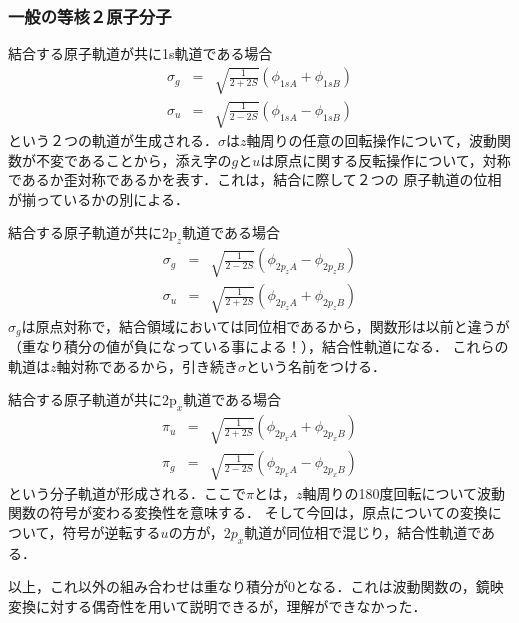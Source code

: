 \documentclass[uplatex, dvipdfmx]{jsreport}
\begin{document}
\subsubsection{一般の等核２原子分子}

\begin{example}
    結合する原子軌道が共に1s軌道である場合
    \begin{eqnarray*}
        \sigma_g&=& \sqrt{\frac{1}{2+2S}}(\phi_{1sA}+\phi_{1sB}) \\
        \sigma_u &=& \sqrt{\frac{1}{2-2S}}(\phi_{1sA}-\phi_{1sB})
    \end{eqnarray*}
    という２つの軌道が生成される．$\sigma$は$z$軸周りの任意の回転操作について，波動関数が不変であることから，添え字の$g$と$u$は原点に関する反転操作について，対称であるか歪対称であるかを表す．これは，結合に際して２つの
    原子軌道の位相が揃っているかの別による．

    結合する原子軌道が共に$2\mathrm{p}_z$軌道である場合
    \begin{eqnarray*}
        \sigma_g&=& \sqrt{\frac{1}{2-2S}}(\phi_{2p_zA}-\phi_{2p_zB}) \\
        \sigma_u &=& \sqrt{\frac{1}{2+2S}}(\phi_{2p_zA}+\phi_{2p_zB})
    \end{eqnarray*}
    $\sigma_g$は原点対称で，結合領域においては同位相であるから，関数形は以前と違うが（重なり積分の値が負になっている事による！），結合性軌道になる．
    これらの軌道は$z$軸対称であるから，引き続き$\sigma$という名前をつける．

    結合する原子軌道が共に$2\mathrm{p}_x$軌道である場合
    \begin{eqnarray*}
        \pi_u &=& \sqrt{\frac{1}{2+2S}}(\phi_{2p_xA}+\phi_{2p_xB}) \\
        \pi_g &=& \sqrt{\frac{1}{2-2S}}(\phi_{2p_xA}-\phi_{2p_xB})
    \end{eqnarray*}
    という分子軌道が形成される．ここで$\pi$とは，$z$軸周りの180度回転について波動関数の符号が変わる変換性を意味する．
    そして今回は，原点についての変換について，符号が逆転する$u$の方が，$2p_x$軌道が同位相で混じり，結合性軌道である．

    以上，これ以外の組み合わせは重なり積分が$0$となる．これは波動関数の，鏡映変換に対する偶奇性を用いて説明できるが，理解ができなかった．
\end{example}
\end{document}
